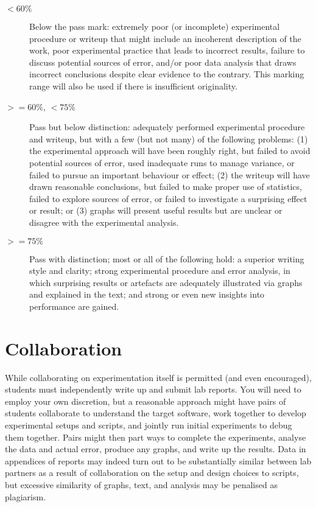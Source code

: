 \documentclass[a4paper,10pt]{article}
\begin{document}
\begin{description}
\item[$<60\%$] Below the pass mark: extremely poor (or incomplete)
  experimental procedure or writeup that might include an incoherent
  description of the work, poor experimental practice that leads to incorrect
  results, failure to discuss potential sources of error, and/or poor data
  analysis that draws incorrect conclusions despite clear evidence to the
  contrary.
  This marking range will also be used if there is insufficient originality.
\item[$>=60\%$, $<75\%$] Pass but below distinction: adequately performed
  experimental procedure and writeup, but with a few (but not many) of the
  following problems:
  (1) the experimental approach will have been roughly right, but failed to
  avoid potential sources of error, used inadequate runs to manage variance,
  or failed to pursue an important behaviour or effect;
  (2) the writeup will have drawn reasonable conclusions, but failed to make
  proper use of statistics, failed to explore sources of error, or failed to
  investigate a surprising effect or result; or
  (3) graphs will present useful results but are unclear or disagree with the
  experimental analysis.
\item[$>=75\%$] Pass with distinction; most or all of the following hold:
  a superior writing style and clarity; strong experimental procedure and
  error analysis, in which surprising results or artefacts are adequately
  illustrated via graphs and explained in the text; and strong or even new
  insights into performance are gained.
\end{description}

\section*{Collaboration}

While collaborating on experimentation itself is permitted (and even
encouraged), students must independently write up and submit lab reports.
You will need to employ your own discretion, but a reasonable approach might
have pairs of students collaborate to understand the target software, work
together to develop experimental setups and scripts, and jointly run initial
experiments to debug them together.
Pairs might then part ways to complete the experiments, analyse the data and
actual error, produce any graphs, and write up the results.
Data in appendices of reports may indeed turn out to be substantially similar
between lab partners as a result of collaboration on the setup and design
choices to scripts, but excessive similarity of graphs, text, and analysis
may be penalised as plagiarism.
\end{document}
